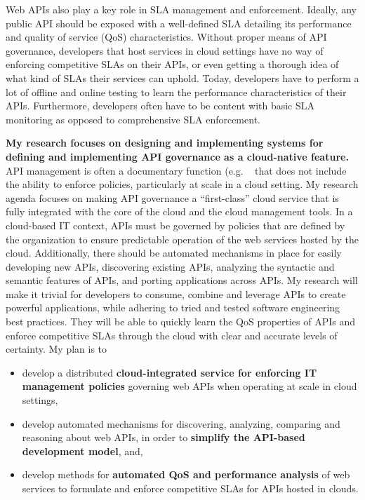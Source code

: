 Web APIs also play a key role in SLA
management and enforcement. Ideally, any public API should be exposed with a well-defined
SLA detailing its performance and quality of service (QoS) characteristics. Without proper means
of API governance, developers that host services in cloud settings have no way of enforcing
competitive SLAs on their APIs, or even getting a thorough idea of what kind of SLAs
their services can uphold. Today, developers have to perform a lot of offline
and online testing to learn the performance characteristics of their APIs.
Furthermore, developers often have to be content with basic SLA monitoring 
as opposed to comprehensive SLA enforcement. 

{\bf My research focuses on designing and implementing systems for defining and
implementing 
API governance as a cloud-native feature.}  API management is often a
documentary function (e.g. ~\cite{apigee,layer7,wso2am} that does not include the ability to
enforce policies, particularly at scale in a cloud setting. 
My research agenda focuses on making API governance a ``first-class'' cloud
service that is fully integrated
with the core of the cloud and the cloud management tools. 
In a cloud-based IT context, APIs must be governed by
policies that are defined by the organization to ensure predictable
operation of the web services hosted by the cloud. Additionally,
there should be automated mechanisms in place for easily developing new
APIs, discovering existing APIs, analyzing the syntactic and semantic features
of APIs, and porting applications across APIs. My research will make 
it trivial for developers to consume, combine and leverage APIs to create powerful
applications, while adhering to tried and tested software engineering 
best practices. They will be able to quickly learn
the QoS properties of APIs and enforce competitive SLAs through the cloud
with clear and accurate levels of certainty. My plan is to
\begin{itemize}
\item develop a distributed {\bf cloud-integrated service for enforcing IT 
management policies} governing
web APIs when operating at scale in cloud settings,
\item develop automated mechanisms for discovering, analyzing, comparing and reasoning
about web APIs, in order to {\bf simplify the API-based development model}, and,
\item develop methods for {\bf automated QoS and performance analysis} of web services
to formulate and enforce competitive SLAs for APIs hosted in clouds.
\end{itemize}

